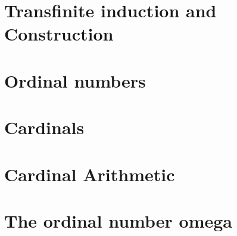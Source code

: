 \section{Transfinite induction and Construction}

\section{Ordinal numbers}

\section{Cardinals}

\section{Cardinal Arithmetic}

\section{The ordinal number omega}
